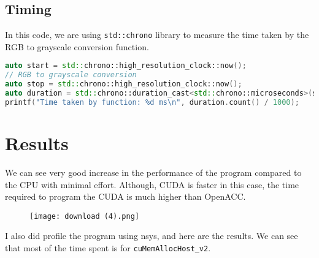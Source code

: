\documentclass{article}
\begin{document}
\subsection{Timing}
In this code, we are using \texttt{std::chrono} library to measure the time taken by the RGB to grayscale conversion function.

\begin{lstlisting}[language=C++,caption={Grouping Kernel with Shared Memory}, label={lst:1},firstnumber=25]
auto start = std::chrono::high_resolution_clock::now();
// RGB to grayscale conversion
auto stop = std::chrono::high_resolution_clock::now();
auto duration = std::chrono::duration_cast<std::chrono::microseconds>(stop - start);
printf("Time taken by function: %d ms\n", duration.count() / 1000);
\end{lstlisting}

\section{Results}

We can see very good increase in the performance of the program compared to the CPU with minimal effort. Although, CUDA is faster in this case, the time required to program the CUDA is much higher than OpenACC.
\begin{figure}[ht]
    \centering
    \texttt{[image: download (4).png]}
\end{figure}

\noindent
I also did profile the program using nsys, and here are the results. We can see that most of the time spent is for \texttt{cuMemAllocHost\_v2}.
\end{document}
